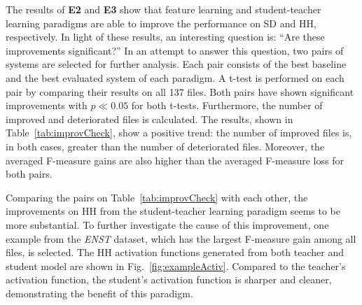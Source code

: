 \documentclass{article}
\begin{document}




The results of \textbf{E2} and \textbf{E3} show that feature learning and student-teacher learning paradigms are able to improve the performance on SD and HH, respectively. In light of these results, an interesting question is: ``Are these improvements significant?'' In an attempt to answer this question, two pairs of systems are selected for further analysis. Each pair consists of the best baseline and the best evaluated system of each paradigm. A t-test is performed on each pair by comparing their results on all 137 files. Both pairs have shown significant improvements with $p \ll 0.05$ for both t-tests. Furthermore, the number of improved and deteriorated files is calculated. The results, shown in Table~\ref{tab:improvCheck}, show a positive trend: the number of improved files is, in both cases, greater than the number of deteriorated files. Moreover, the averaged F-measure gains are also higher than the averaged F-measure loss for both pairs.  

Comparing the pairs on Table~\ref{tab:improvCheck} with each other, the improvements on HH from the student-teacher learning paradigm seems to be more substantial. To further investigate the cause of this improvement, one example from the \textit{ENST} dataset, which has the largest F-measure gain among all files, is selected. The HH activation functions generated from both teacher and student model are shown in Fig.~\ref{fig:exampleActiv}. Compared to the teacher's activation function, the student's activation function is sharper and cleaner, demonstrating the benefit of this paradigm.
\end{document}
